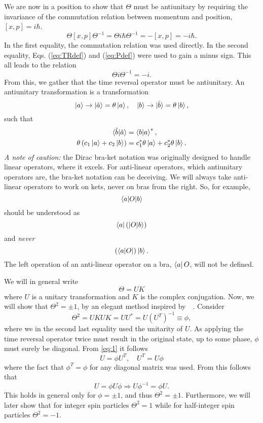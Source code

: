 We are now in a position to show that $\Theta$ must be antiunitary by requiring the invariance of the commutation relation between momentum and position, $[x, p] = i\hbar$.
\begin{equation}
  \Theta [x, p] \Theta^{-1} = \Theta i\hbar \Theta^{-1} = - [x, p] = -i\hbar.
\end{equation}
In the first equality, the commutation relation was used directly.
In the second equality, Eqs. (\ref{eq:TRdef}) and (\ref{eq:Pdef}) were used to gain a minus sign.
This all leads to the relation
\begin{equation}
  \Theta i \Theta^{-1} = -i.
\end{equation}
From this, we gather that the time reversal operator must be antiunitary.
An antiunitary transformation is a transformation
$$
\ket{a} \rightarrow \ket{\tilde{a}} = \theta \ket{a}, \quad 
\ket{b} \rightarrow \ket{\tilde{b}} = \theta \ket{b},
$$
such that
\begin{align}
  \braket{\tilde{b} | \tilde{a}} &= \braket{b | a}^*,\\
  \theta\left(c_1 \ket{a} + c_2 \ket{b}\right) &= c_1^* \theta\ket{a} + c_2^* \theta\ket{b}.
\end{align}
\emph{A note of caution:} the Dirac bra-ket notation was originally designed to handle linear operators, where it excels.
For anti-linear operators, which antiunitary operators are, the bra-ket notation can be deceiving.
We will always take anti-linear operators to work on kets, never on bras from the right.
So, for example,
$$ \braket{a| O | b} $$
should be understood as
$$ \bra{a} \left(\ket{O |b}\right)$$
and \emph{never}
$$ \left(\bra{a|O}\right) \ket{b}.$$
The left operation of an anti-linear operator on a bra, $\bra{a} O$, will not be defined.

We will in general write
\begin{equation}
  \label{eq:time-rev-def}
  \Theta = U K
\end{equation}
where $U$ is a unitary transformation and $K$ is the complex conjugation.
Now, we will show that $\Theta^2 = \pm 1$, by an elegant method inspired by~\citeauthor{bernevigTopologicalInsulatorsTopological2013}~\cite{bernevigTopologicalInsulatorsTopological2013}.
Consider
\begin{equation}
  \label{eq:1}
  \Theta^2 = UKUK = UU^* = U(U^T)^{-1} \equiv \phi,
\end{equation}
where we in the second last equality used the unitarity of $U$.
As applying the time reversal operator twice must result in the original state, up to some phase, $\phi$ must surely be diagonal.
From \cref{eq:1} it follows
\begin{equation}
  U = \phi U^T, \quad U^T = U \phi
\end{equation}
where the fact that $\phi^T = \phi$ for any diagonal matrix was used.
From this follows that
\begin{equation}
  U = \phi U \phi \Rightarrow U \phi^{-1} = \phi U.
\end{equation}
This holds in general only for $\phi = \pm 1$, and thus $\Theta^2 = \pm 1$.
Furthermore, we will later show that for integer spin particles $\Theta^2 = 1$ while for half-integer spin particles $\Theta^2 = -1$.

